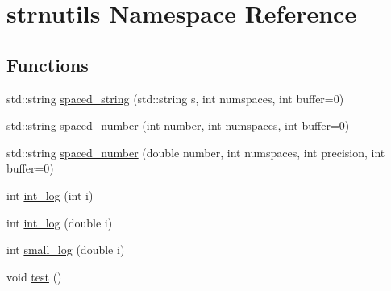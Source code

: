 \hypertarget{namespacestrnutils}{
\section{strnutils Namespace Reference}
\label{namespacestrnutils}
}
\subsection*{Functions}
\begin{DoxyCompactItemize}
\item 
std::string \hyperlink{namespacestrnutils_a0b72b12eb27c65df87f36eadc4b8c68c}{spaced\_\-string} (std::string s, int numspaces, int buffer=0)
\item 
std::string \hyperlink{namespacestrnutils_a727f54c0678b84fb6ea3c7330779bdc9}{spaced\_\-number} (int number, int numspaces, int buffer=0)
\item 
std::string \hyperlink{namespacestrnutils_a68527d204971afac794cff1d78e3556f}{spaced\_\-number} (double number, int numspaces, int precision, int buffer=0)
\item 
int \hyperlink{namespacestrnutils_a997ca9ec4292378552d7dc0a4ff5c78f}{int\_\-log} (int i)
\item 
int \hyperlink{namespacestrnutils_a824998df37bca6b260b9829e9a8a469d}{int\_\-log} (double i)
\item 
int \hyperlink{namespacestrnutils_a9626f017ab7690de87b8c154b9acd426}{small\_\-log} (double i)
\item 
void \hyperlink{namespacestrnutils_a1b83b9cdc56836d9e5981f61a9a985a9}{test} ()
\end{DoxyCompactItemize}


